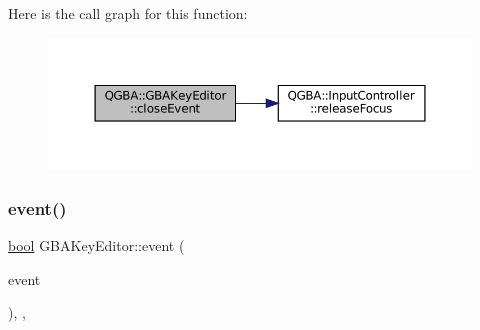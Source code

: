 Here is the call graph for this function\+:
\nopagebreak
\begin{figure}[H]
\begin{center}
\leavevmode
\includegraphics[width=350pt]{class_q_g_b_a_1_1_g_b_a_key_editor_ab0aa3144558fdbc605a8dd04939dd670_cgraph}
\end{center}
\end{figure}
\mbox{\label{class_q_g_b_a_1_1_g_b_a_key_editor_a5e0ea82cb3b9547511dff167b10922a1}} 
\subsubsection{\texorpdfstring{event()}{event()}}
{\footnotesize\ttfamily \mbox{\hyperlink{libretro_8h_a4a26dcae73fb7e1528214a068aca317e}{bool}} G\+B\+A\+Key\+Editor\+::event (\begin{DoxyParamCaption}\item[{Q\+Event $\ast$}]{event }\end{DoxyParamCaption})\hspace{0.3cm}{\ttfamily [override]}, {\ttfamily [protected]}, {\ttfamily [virtual]}}

